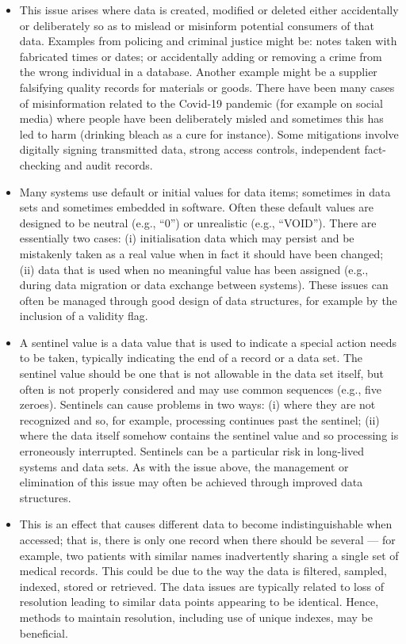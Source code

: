 \begin{itemize}
  \item {} This issue arises where data is created, modified or deleted either accidentally or deliberately so as to mislead or misinform potential consumers of that data. Examples from policing and criminal justice might be: notes taken with fabricated times or dates; or accidentally adding or removing a crime from the wrong individual in a \gls{database}. Another example might be a supplier falsifying quality records for materials or goods. There have been many cases of misinformation related to the Covid-19 pandemic (for example on social media) where people have been deliberately misled and sometimes this has led to harm (drinking bleach as a cure for instance). Some mitigations involve digitally signing transmitted data, strong access controls, independent fact-checking and audit records.

  \item {} Many systems use default or initial values for data items; sometimes in data sets and sometimes embedded in software. Often these default values are designed to be neutral (e.g., ``0'') or unrealistic (e.g., ``VOID''). There are essentially two cases: (i) initialisation data which may persist and be mistakenly taken as a real value when in fact it should have been changed; (ii) data that is used when no meaningful value has been assigned (e.g., during data migration or data exchange between systems). These issues can often be managed through good design of data structures, for example by the inclusion of a validity flag.

  \item {} A sentinel value is a data value that is used to indicate a special action needs to be taken, typically indicating the end of a record or a data set. The sentinel value should be one that is not allowable in the data set itself, but often is not properly considered and may use common sequences (e.g., five zeroes). Sentinels can cause problems in two ways: (i) where they are not recognized and so, for example, processing continues past the sentinel; (ii) where the data itself somehow contains the sentinel value and so processing is erroneously interrupted. Sentinels can be a particular risk in long-lived systems and data sets. As with the issue above, the management or elimination of this issue may often be achieved through improved data structures.

  \item {} This is an effect that causes different data to become indistinguishable when accessed; that is, there is only one record when there should be several --- for example, two patients with similar names inadvertently sharing a single set of medical records. This could be due to the way the data is filtered, sampled, indexed, stored or retrieved. The data issues are typically related to loss of resolution leading to similar data points appearing to be identical. Hence, methods to maintain resolution, including use of unique indexes, may be beneficial.


\end{itemize}
